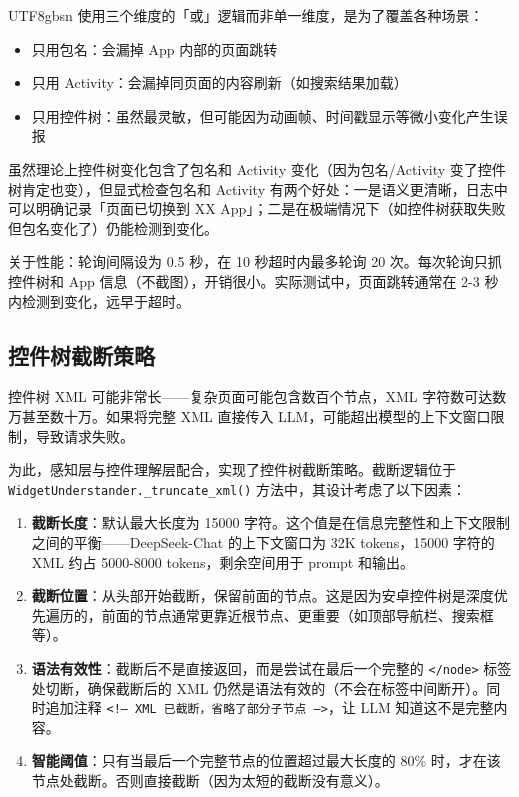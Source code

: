 \documentclass{article}
\begin{document}
\begin{CJK}{UTF8}{gbsn}
使用三个维度的「或」逻辑而非单一维度，是为了覆盖各种场景：

\begin{itemize}
  \item 只用包名：会漏掉 App 内部的页面跳转
  \item 只用 Activity：会漏掉同页面的内容刷新（如搜索结果加载）
  \item 只用控件树：虽然最灵敏，但可能因为动画帧、时间戳显示等微小变化产生误报
\end{itemize}

虽然理论上控件树变化包含了包名和 Activity 变化（因为包名/Activity 变了控件树肯定也变），但显式检查包名和 Activity 有两个好处：一是语义更清晰，日志中可以明确记录「页面已切换到 XX App」；二是在极端情况下（如控件树获取失败但包名变化了）仍能检测到变化。

关于性能：轮询间隔设为 0.5 秒，在 10 秒超时内最多轮询 20 次。每次轮询只抓控件树和 App 信息（不截图），开销很小。实际测试中，页面跳转通常在 2-3 秒内检测到变化，远早于超时。

\subsection{控件树截断策略}

控件树 XML 可能非常长——复杂页面可能包含数百个节点，XML 字符数可达数万甚至数十万。如果将完整 XML 直接传入 LLM，可能超出模型的上下文窗口限制，导致请求失败。

为此，感知层与控件理解层配合，实现了控件树截断策略。截断逻辑位于 \texttt{WidgetUnderstander.\_truncate\_xml()} 方法中，其设计考虑了以下因素：

\begin{enumerate}[leftmargin*]
  \item \textbf{截断长度}：默认最大长度为 15000 字符。这个值是在信息完整性和上下文限制之间的平衡——DeepSeek-Chat 的上下文窗口为 32K tokens，15000 字符的 XML 约占 5000-8000 tokens，剩余空间用于 prompt 和输出。
  \item \textbf{截断位置}：从头部开始截断，保留前面的节点。这是因为安卓控件树是深度优先遍历的，前面的节点通常更靠近根节点、更重要（如顶部导航栏、搜索框等）。
  \item \textbf{语法有效性}：截断后不是直接返回，而是尝试在最后一个完整的 \texttt{</node>} 标签处切断，确保截断后的 XML 仍然是语法有效的（不会在标签中间断开）。同时追加注释 \texttt{<!-- XML 已截断，省略了部分子节点 -->}，让 LLM 知道这不是完整内容。
  \item \textbf{智能阈值}：只有当最后一个完整节点的位置超过最大长度的 80\% 时，才在该节点处截断。否则直接截断（因为太短的截断没有意义）。
\end{enumerate}


\end{CJK}
\end{document}
